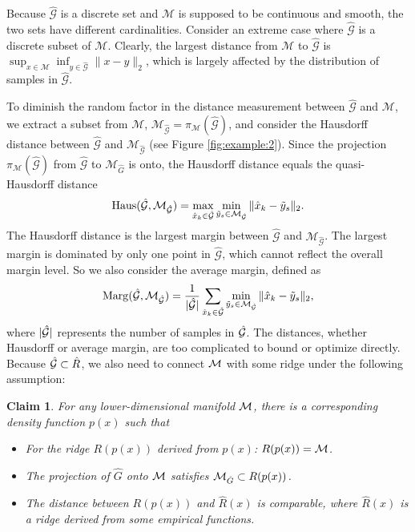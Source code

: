 \documentclass[aos,preprint]{imsart}
\newcommand{\Yao}[1]{{\textcolor{red}{[Yao: #1]}}}%
\newtheorem{claim}[axiom]{Claim}
\theoremstyle{remark}
\begin{document}
Because $\hat{\mathcal G}$ is a discrete set and $\mathcal M$ is supposed to be continuous and smooth, the two sets have different cardinalities. Consider an extreme case where $\hat{\mathcal G}$ is a discrete subset of $\mathcal M$. Clearly, the largest distance from $\mathcal M$ to $\hat{\mathcal G}$ is $\sup_{x\in \mathcal M}\inf_{y\in\hat{\mathcal G}} \|x-y\|_2$, which is largely affected by the distribution of samples in $\hat{\mathcal G}$.

To diminish the random factor in the distance measurement between $\hat{\mathcal G}$ and $\mathcal M$, we extract a subset from $\mathcal M$, ${\mathcal M}_{\hat{\mathcal G}}=\pi_{\mathcal M}(\hat{\mathcal G})$, and consider the Hausdorff distance between ${\hat{\mathcal G}}$ and ${\mathcal M}_{\hat{\mathcal G}}$ (see Figure \ref{fig:example:2}). Since the projection $\pi_{\mathcal M}(\hat{\mathcal G})$ from $\hat{\mathcal G}$ to $\mathcal M_{\hat{G}}$ is onto, the Hausdorff distance equals the quasi-Hausdorff distance
\begin{equation}\label{Hausd}
{\rm Haus}({\hat{\mathcal G}}, {\mathcal M}_{\hat{\mathcal G}}) = \max_{\hat{x}_k\in \hat{\mathcal G}} \min_{\tilde{y}_s\in {\mathcal M}_{\hat{\mathcal G}}}\|\hat{x}_k-\tilde{y}_s\|_2.
\end{equation}
The Hausdorff distance is the largest margin between $\hat{\mathcal G}$ and ${\mathcal M}_{\hat{\mathcal G}}$. The largest margin is dominated by only one point in $\hat{\mathcal G}$, which cannot reflect the overall margin level. So we also consider the average margin, defined as
\begin{equation}\label{margin}
{\rm Marg}({\hat{\mathcal G}, {\mathcal M}_{\hat{\mathcal G}}}) = \frac{1}{|\hat{\mathcal G}|} \sum_{\hat{x}_k\in \hat{\mathcal G}} \min_{\tilde{y}_s\in {\mathcal M}_{\hat{\mathcal G}}}\|\hat{x}_k-\tilde{y}_s\|_2,
\end{equation}
where $|\cal \hat{G}|$ represents the number of samples in $\cal \hat{G}$.
The distances, whether Hausdorff or average margin, are too complicated to bound or optimize directly. Because $\hat{\cal G}\subset \hat{R}$,  we also need to connect $\cal M$ with some ridge under the following assumption:
\begin{claim}\label{Data_assumption}
For any lower-dimensional manifold $\cal M$, there is a corresponding density function $p(x)$ such that 
\begin{itemize}
\item[1.] For the ridge $R(p(x))$ derived from $p(x)$: $R(p(x))={\cal M}$.
\item[2.] The projection of $\hat{G}$ onto ${\cal M}$ satisfies ${\cal M}_{\hat{G}}\subset R(p(x))$.
\item[3.] The distance between $R(p(x))$ and $\hat{R}(x)$ is comparable, where $\hat{R}(x)$ is a ridge derived from some empirical functions.
\end{itemize}
\end{claim}
\end{document}
